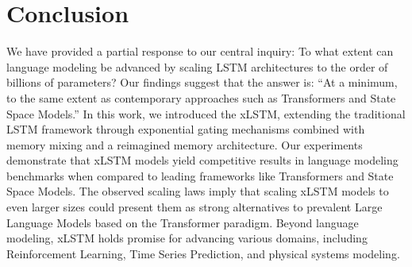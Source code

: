 \section{Conclusion}
We have provided a partial response to our central inquiry: To what extent can language modeling be advanced by scaling LSTM architectures to the order of billions of parameters? Our findings suggest that the answer is: ``At a minimum, to the same extent as contemporary approaches such as Transformers and State Space Models.'' In this work, we introduced the xLSTM, extending the traditional LSTM framework through exponential gating mechanisms combined with memory mixing and a reimagined memory architecture. Our experiments demonstrate that xLSTM models yield competitive results in language modeling benchmarks when compared to leading frameworks like Transformers and State Space Models. The observed scaling laws imply that scaling xLSTM models to even larger sizes could present them as strong alternatives to prevalent Large Language Models based on the Transformer paradigm. Beyond language modeling, xLSTM holds promise for advancing various domains, including Reinforcement Learning, Time Series Prediction, and physical systems modeling.

